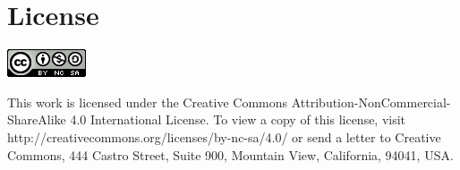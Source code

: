 \chapter{License}



\begin{center}
 \includegraphics{images/cc_logo}
 
 
 
This work is licensed under the Creative Commons 
Attribution-NonCommercial-ShareAlike 4.0 International License. To view a copy 
of this license, visit http://creativecommons.org/licenses/by-nc-sa/4.0/ or send 
a letter to Creative Commons, 444 Castro Street, Suite 900, Mountain View, 
California, 94041, USA.

\end{center}

\begin{verbatim}

\end{verbatim}